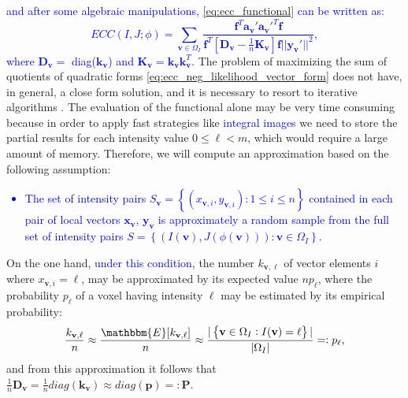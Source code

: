 \textcolor{blue}{and after some algebraic manipulations, \eqref{eq:ecc_functional} can be written as:
\begin{equation}\label{eq:ecc_neg_likelihood_vector_form}
    ECC(I, J;\phi) = \sum_{\mathbf{v} \in \Omega_{I}}\frac{\mathbf{f}^{T}\mathbf{a_{v}'}\mathbf{a_{v}'}^{T}\mathbf{f}}{\mathbf{f}^{T} \left[ \mathbf{D_{v}} - \frac{1}{n}\mathbf{K_{v}}\right]\mathbf{f} ||\mathbf{y_{v}'}||^{2}},
\end{equation}
where $\mathbf{D}_{\mathbf{v}} = $ diag($\mathbf{k}_{\mathbf{v}}$) and $\mathbf{K_{v}} = \mathbf{k_{v}}\mathbf{k}^{T}_{\mathbf{v}}$.} The problem of maximizing the sum of quotients of quadratic forms \eqref{eq:ecc_neg_likelihood_vector_form} does not have, in general, a close form solution, and it is necessary to resort to iterative algorithms \cite{Kiers1995}. The evaluation of the functional alone may be very time consuming because in order to apply fast strategies like \textcolor{blue}{integral images \cite{Crow1984}\cite{Viola2004}\cite{Tapia2011}} we need to store the partial results for each intensity value $0 \leq \ell < m$, which would require a large amount of memory. Therefore, we will compute an approximation based on the following assumption:
\textcolor{blue}{\begin{itemize}
    \item The set of intensity pairs $S_{\mathbf{v}}=\left\lbrace \left(x_{\mathbf{v}, i}, y_{\mathbf{v}, i}\right): 1\leq i \leq n\right\rbrace$ contained in each pair of local vectors $\mathbf{x}_{\mathbf{v}}$, $\mathbf{y}_{\mathbf{v}}$ is approximately a random sample from the full set of intensity pairs $S=\left\lbrace \left(I(\mathbf{v}), J(\phi(\mathbf{v}))\right): \mathbf{v}\in \Omega_{I}\right\rbrace$.
\end{itemize}}
On the one hand, \textcolor{blue}{under this condition,} the number $k_{\mathbf{v},\ell}$ of vector elements $i$ where $x_{\mathbf{v},i} = \ell$, may be approximated by its expected value $np_{\ell}$, where the probability $p_{\ell}$ of a voxel having intensity $\ell$ may be estimated by its empirical probability:
\begin{equation}
    \frac{k_{\mathbf{v}, \ell}}{n} \approx \frac{\mathbbm{E}[k_{\mathbf{v},\ell}]}{n} \approx \frac{|\left\lbrace \mathbf{v}\in\Omega_{I} : I(\mathbf{v}) = \ell\right\rbrace|}{|\Omega_{I}|} =: p_{\ell},
\end{equation}
and from this approximation it follows that $\frac{1}{n}\mathbf{D}_{\mathbf{v}} = \frac{1}{n}diag(\mathbf{k}_{\mathbf{v}}) \approx diag(\mathbf{p}) =: \mathbf{P}$.\\

